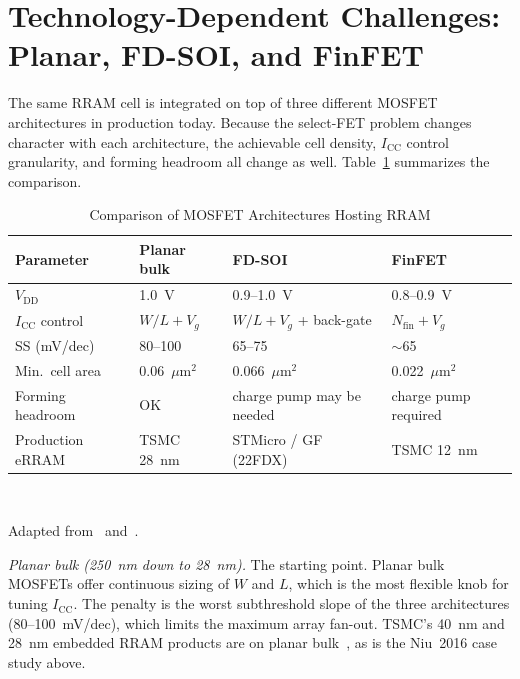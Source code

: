 \documentclass[lettersize,journal]{IEEEtran}
\begin{document}
\section{Technology-Dependent Challenges: Planar, FD-SOI, and FinFET}\label{sec:tech}
The same RRAM cell is integrated on top of three different MOSFET architectures in production today. Because the select-FET problem changes character with each architecture, the achievable cell density, $I_\mathrm{CC}$ control granularity, and forming headroom all change as well. Table~\ref{tab:arch} summarizes the comparison.

\begin{table}[!t]
\caption{Comparison of MOSFET Architectures Hosting RRAM\label{tab:arch}}
\centering
\scriptsize
\renewcommand{\arraystretch}{1.2}
\begin{tabular}{|p{0.78in}|p{0.55in}|p{0.85in}|p{0.65in}|}
\hline
\textbf{Parameter} & \textbf{Planar bulk} & \textbf{FD-SOI} & \textbf{FinFET} \\
\hline
$V_\mathrm{DD}$ & 1.0~V & 0.9--1.0~V & 0.8--0.9~V \\
\hline
$I_\mathrm{CC}$ control & $W/L + V_g$ & $W/L + V_g$ + back-gate & $N_\mathrm{fin} + V_g$ \\
\hline
SS (mV/dec) & 80--100 & 65--75 & $\sim$65 \\
\hline
Min.\ cell area & 0.06~$\mu$m$^2$ & 0.066~$\mu$m$^2$ & 0.022~$\mu$m$^2$ \\
\hline
Forming headroom & OK & charge pump may be needed & charge pump required \\
\hline
Production eRRAM & TSMC 28~nm & STMicro / GF (22FDX) & TSMC 12~nm \\
\hline
\end{tabular}
\\[2pt]
\raggedright Adapted from~\cite{ref_ielmini2016} and~\cite{ref_hellenbrand2024}.
\end{table}

\textit{Planar bulk (250~nm down to 28~nm).} The starting point. Planar bulk MOSFETs offer continuous sizing of $W$ and $L$, which is the most flexible knob for tuning $I_\mathrm{CC}$. The penalty is the worst subthreshold slope of the three architectures (80--100~mV/dec), which limits the maximum array fan-out. TSMC's 40~nm and 28~nm embedded RRAM products are on planar bulk~\cite{ref_hellenbrand2024}, as is the Niu~2016 case study above.
\end{document}
